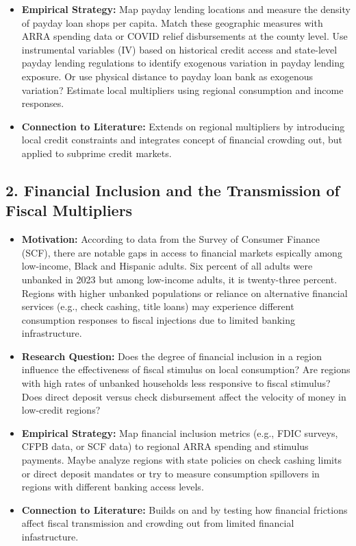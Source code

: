 \documentclass[10pt]{article}
\begin{document}
\begin{itemize}
\item \textbf{Empirical Strategy:} Map payday lending locations and measure the density of payday loan shops per capita. Match these geographic measures with ARRA spending data or COVID relief disbursements at the county level. Use instrumental variables (IV) based on historical credit access and state-level payday lending regulations to identify exogenous variation in payday lending exposure. Or use physical distance to payday loan bank as exogenous variation? Estimate local multipliers using regional consumption and income responses.
\item \textbf{Connection to Literature:} Extends \citet{nakamura2011fiscal} on regional multipliers by introducing local credit constraints and integrates \citet{pinardon2023crowding} concept of financial crowding out, but applied to subprime credit markets.
\end{itemize}


\subsection*{2. Financial Inclusion and the Transmission of Fiscal Multipliers}
\begin{itemize}
\item \textbf{Motivation:} According to data from the Survey of Consumer Finance (SCF), there are notable gaps in access to financial markets espically among low-income, Black and Hispanic adults. Six percent of all adults were unbanked in 2023 but among low-income adults, it is twenty-three percent. Regions with higher unbanked populations or reliance on alternative financial services (e.g., check cashing, title loans) may experience different consumption responses to fiscal injections due to limited banking infrastructure.
\item \textbf{Research Question:}  Does the degree of financial inclusion in a region influence the effectiveness of fiscal stimulus on local consumption? Are regions with high rates of unbanked households less responsive to fiscal stimulus? Does direct deposit versus check disbursement affect the velocity of money in low-credit regions?
\item \textbf{Empirical Strategy:} Map financial inclusion metrics (e.g., FDIC surveys, CFPB data, or SCF data) to regional ARRA spending and stimulus payments. Maybe analyze regions with state policies on check cashing limits or direct deposit mandates or try to measure consumption spillovers in regions with different banking access levels.

\item \textbf{Connection to Literature:} Builds on \citet{woodford2011simple} and \citet{pinardon2023crowding} by testing how financial frictions affect fiscal transmission and crowding out from limited financial infastructure.
\end{itemize}




\newpage 


\end{document}
